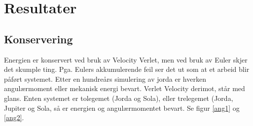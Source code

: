 \documentclass[11pt,a4paper]{article}
\begin{document}
\section{Resultater}
\subsection{Konservering}
Energien er konservert ved bruk av Velocity Verlet, men ved bruk av Euler skjer det skumple ting.
Pga. Eulers akkumulerende feil ser det ut som at et arbeid blir påført systemet. Etter en hundreårs simulering av jorda er hverken angulærmoment eller mekanisk energi bevart.
Verlet Velocity derimot, står med glans. Enten systemet er tolegemet (Jorda og Sola), eller trelegemet (Jorda, Jupiter og Sola, så er energien og angulærmomentet bevart. Se figur \ref{ang1} og \ref{ang2}.\\
\end{document}
